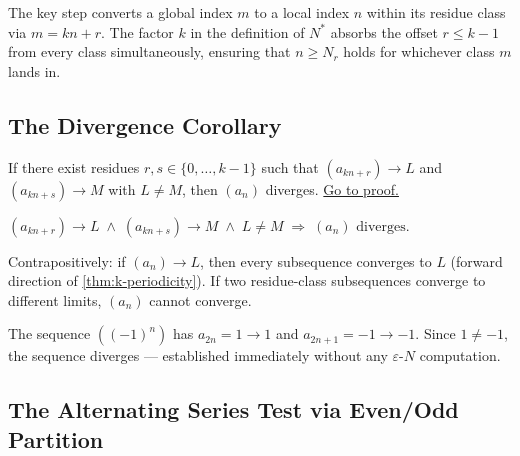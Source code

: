 \begin{remark}
The key step converts a global index $m$ to a local index $n$ within its
residue class via $m = kn + r$. The factor $k$ in the definition of $N^*$
absorbs the offset $r \leq k-1$ from every class simultaneously, ensuring
that $n \geq N_r$ holds for whichever class $m$ lands in.
\end{remark}

\subsection*{The Divergence Corollary}
\label{subsec:residue-divergence}

\begin{proposition}
\label{prop:residue-divergence}
If there exist residues $r, s \in \{0,\ldots,k-1\}$ such that
$(a_{kn+r}) \to L$ and $(a_{kn+s}) \to M$ with $L \neq M$, then
$(a_n)$ diverges.
\hyperref[prf:residue-divergence]{Go to proof.}
\end{proposition}

\begin{remark*}
\end{remark*}


\begin{remark}
$(a_{kn+r}) \to L \;\land\; (a_{kn+s}) \to M \;\land\; L \neq M
\;\Rightarrow\; (a_n) \text{ diverges}$.
\end{remark}

\begin{remark}
Contrapositively: if $(a_n) \to L$, then every subsequence converges to
$L$ (forward direction of \cref{thm:k-periodicity}). If two residue-class
subsequences converge to different limits, $(a_n)$ cannot converge.
\end{remark}

\begin{remark}
The sequence $((-1)^n)$ has $a_{2n} = 1 \to 1$ and $a_{2n+1} = -1 \to -1$.
Since $1 \neq -1$, the sequence diverges — established immediately without
any $\varepsilon$-$N$ computation.
\end{remark}

\subsection*{The Alternating Series Test via Even/Odd Partition}
\label{subsec:ast-even-odd}


